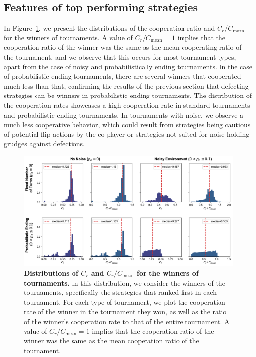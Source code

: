 \documentclass{article}
\begin{document}
\subsection{Features of top performing strategies}\label{section:winning_features}

In Figure~\ref{fig:discussion_cooperation_measures}, we present the
distributions of the cooperation ratio and \(C_r / C_{\text{mean}}\) for the
winners of tournaments. A value of \(C_r / C_{\text{mean}} = 1\) implies that
the cooperation ratio of the winner was the same as the mean cooperating ratio
of the tournament, and we observe that this occurs for most tournament types,
apart from the case of noisy and probabilistically ending tournaments. In the case of
probabilistic ending tournaments, there are several winners that cooperated much
less than that, confirming the results of the previous section that defecting
strategies can be winners in probabilistic ending tournaments. The distribution
of the cooperation rates showcases a high cooperation rate in standard
tournaments and probabilistic ending tournaments. In tournaments with noise, we
observe a much less cooperative behavior, which could result from strategies
being cautious of potential flip actions by the co-player or strategies not
suited for noise holding grudges against defections.

\begin{figure}[!htbp]
    \centering
        \centering
        \includegraphics[width=\textwidth]{../images/features_result.pdf}
        \caption{{\bf Distributions of \(C_r\) and \(C_r / C_{\text{mean}}\)
        for the winners of tournaments.} In this distribution, we consider the
        winners of the tournaments, specifically the strategies that ranked
        first in each tournament. For each type of tournament, we plot the
        cooperation rate of the winner in the tournament they won, as well as
        the ratio of the winner's cooperation rate to that of the entire
        tournament. A value of \(C_r / C_{\text{mean}} = 1\) implies that the
        cooperation ratio of the winner was the same as the mean cooperation
        ratio of the tournament.}
        \label{fig:discussion_cooperation_measures}
\end{figure}
\end{document}
